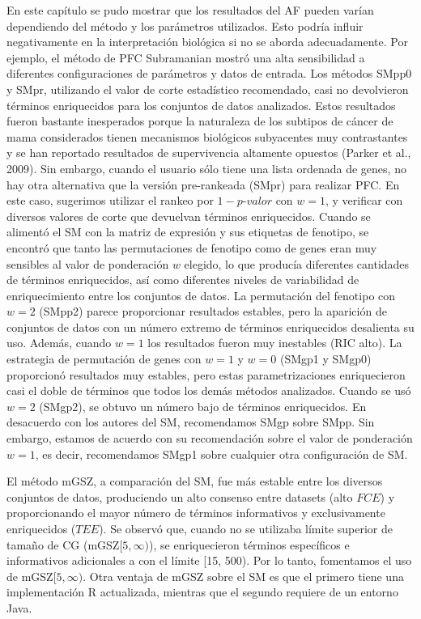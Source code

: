 \documentclass[12pt,twoside]{reedthesis}
\begin{document}
En este capítulo se pudo mostrar que los resultados del AF pueden varían dependiendo del método y los parámetros utilizados. Esto podría influir negativamente en la interpretación biológica si no se aborda adecuadamente. Por ejemplo, el método de PFC Subramanian mostró una alta sensibilidad a diferentes configuraciones de parámetros y datos de entrada. Los métodos SMpp0 y SMpr, utilizando el valor de corte estadístico recomendado, casi no devolvieron términos enriquecidos para los conjuntos de datos analizados. Estos resultados fueron bastante inesperados porque la naturaleza de los subtipos de cáncer de mama considerados tienen mecanismos biológicos subyacentes muy contrastantes y se han reportado resultados de supervivencia altamente opuestos (Parker et al., 2009). Sin embargo, cuando el usuario sólo tiene una lista ordenada de genes, no hay otra alternativa que la versión pre-rankeada (SMpr) para realizar PFC. En este caso, sugerimos utilizar el rankeo por \(1-p\)-\(valor\) con \(w=1\), y verificar con diversos valores de corte que devuelvan términos enriquecidos. Cuando se alimentó el SM con la matriz de expresión y sus etiquetas de fenotipo, se encontró que tanto las permutaciones de fenotipo como de genes eran muy sensibles al valor de ponderación \(w\) elegido, lo que producía diferentes cantidades de términos enriquecidos, así como diferentes niveles de variabilidad de enriquecimiento entre los conjuntos de datos. La permutación del fenotipo con \(w=2\) (SMpp2) parece proporcionar resultados estables, pero la aparición de conjuntos de datos con un número extremo de términos enriquecidos desalienta su uso. Además, cuando \(w=1\) los resultados fueron muy inestables (RIC alto). La estrategia de permutación de genes con \(w=1\) y \(w=0\) (SMgp1 y SMgp0) proporcionó resultados muy estables, pero estas parametrizaciones enriquecieron casi el doble de términos que todos los demás métodos analizados. Cuando se usó \(w=2\) (SMgp2), se obtuvo un número bajo de términos enriquecidos. En desacuerdo con los autores del SM, recomendamos SMgp sobre SMpp. Sin embargo, estamos de acuerdo con su recomendación sobre el valor de ponderación \(w=1\), es decir, recomendamos SMgp1 sobre cualquier otra configuración de SM.

\par

El método mGSZ, a comparación del SM, fue más estable entre los diversos conjuntos de datos, produciendo un alto consenso entre datasets (alto \(FCE\)) y proporcionando el mayor número de términos informativos y exclusivamente enriquecidos (\(TEE\)). Se observó que, cuando no se utilizaba límite superior de tamaño de CG (mGSZ\([5,\infty)\)), se enriquecieron términos específicos e informativos adicionales a con el límite {[}15, 500). Por lo tanto, fomentamos el uso de mGSZ\([5,\infty)\). Otra ventaja de mGSZ sobre el SM es que el primero tiene una implementación R actualizada, mientras que el segundo requiere de un entorno Java.
\end{document}
